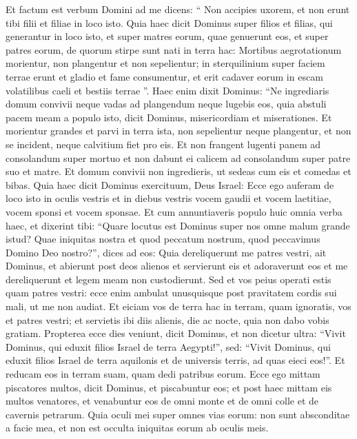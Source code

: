 \begin{biblechapter}
\begin{biblechapter}
\begin{biblechapter}
\begin{biblechapter}
\begin{biblechapter}
\begin{biblechapter}
\begin{biblechapter}
\begin{biblechapter}
\begin{biblechapter}
\begin{biblechapter}
\begin{biblechapter}
\begin{biblechapter}
\begin{biblechapter}
\begin{biblechapter}
\begin{biblechapter}
\begin{biblechapter}
\verse Et factum est verbum Domini ad me dicens: 
\verse “ Non accipies uxorem, et non erunt tibi filii et filiae in loco isto. 
\verse Quia haec dicit Dominus super filios et filias, qui generantur in loco isto, et super matres eorum, quae genuerunt eos, et super patres eorum, de quorum stirpe sunt nati in terra hac: 
 \verse Mortibus aegrotationum morientur, non plangentur et non sepelientur; in sterquilinium super faciem terrae erunt et gladio et fame consumentur, et erit cadaver eorum in escam volatilibus caeli et bestiis terrae ”. 
\verse Haec enim dixit Dominus: “Ne ingrediaris domum convivii neque vadas ad plangendum neque lugebis eos, quia abstuli pacem meam a populo isto, dicit Dominus, misericordiam et miserationes. 
\verse Et morientur grandes et parvi in terra ista, non sepelientur neque plangentur, et non se incident, neque calvitium fiet pro eis. 
 \verse Et non frangent lugenti panem ad consolandum super mortuo et non dabunt ei calicem ad consolandum super patre suo et matre. 
\verse Et domum convivii non ingredieris, ut sedeas cum eis et comedas et bibas. 
\verse Quia haec dicit Dominus exercituum, Deus Israel: Ecce ego auferam de loco isto in oculis vestris et in diebus vestris vocem gaudii et vocem laetitiae, vocem sponsi et vocem sponsae.
 \verse Et cum annuntiaveris populo huic omnia verba haec, et dixerint tibi: “Quare locutus est Dominus super nos omne malum grande istud? Quae iniquitas nostra et quod peccatum nostrum, quod peccavimus Domino Deo nostro?”, 
\verse dices ad eos: Quia dereliquerunt me patres vestri, ait Dominus, et abierunt post deos alienos et servierunt eis et adoraverunt eos et me dereliquerunt et legem meam non custodierunt. 
\verse Sed et vos peius operati estis quam patres vestri: ecce enim ambulat unusquisque post pravitatem cordis sui mali, ut me non audiat. 
 \verse Et eiciam vos de terra hac in terram, quam ignoratis, vos et patres vestri; et servietis ibi diis alienis, die ac nocte, quia non dabo vobis gratiam.
 \verse Propterea ecce dies veniunt, dicit Dominus, et non dicetur ultra: “Vivit Dominus, qui eduxit filios Israel de terra Aegypti!”, 
\verse sed: “Vivit Dominus, qui eduxit filios Israel de terra aquilonis et de universis terris, ad quas eieci eos!”. Et reducam eos in terram suam, quam dedi patribus eorum.
 \verse Ecce ego mittam piscatores multos, dicit Dominus, et piscabuntur eos; et post haec mittam eis multos venatores, et venabuntur eos de omni monte et de omni colle et de cavernis petrarum. 
\verse Quia oculi mei super omnes vias eorum: non sunt absconditae a facie mea, et non est occulta iniquitas eorum ab oculis meis. 

\end{biblechapter}
\end{biblechapter}
\end{biblechapter}
\end{biblechapter}
\end{biblechapter}
\end{biblechapter}
\end{biblechapter}
\end{biblechapter}
\end{biblechapter}
\end{biblechapter}
\end{biblechapter}
\end{biblechapter}
\end{biblechapter}
\end{biblechapter}
\end{biblechapter}
\end{biblechapter}
